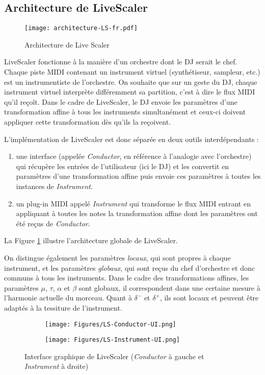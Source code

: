 \subsection{Architecture de LiveScaler}

\begin{figure}[htbp]
  \centering
	\texttt{[image: architecture-LS-fr.pdf]}
  \caption{Architecture de Live Scaler\label{fig:archi}}
\end{figure}

LiveScaler fonctionne à la manière d'un orchestre dont le  DJ serait le chef. Chaque piste MIDI contenant un instrument virtuel (synthétiseur, sampleur, etc.) est un instrumentiste de l'orchestre. On souhaite que sur un geste du DJ, chaque instrument virtuel interprète différemment sa partition, c'est à dire le flux MIDI qu'il reçoît. Dans le cadre de LiveScaler, le DJ envoie les paramètres d'une transformation affine à tous les instruments simultanément et ceux-ci doivent appliquer cette transformation dès qu'ils la reçoivent.

L'implémentation de LiveScaler est donc séparée en deux outils interdépendants : 
\begin{enumerate}
  \item une interface (appelée \emph{Conductor}, en référence à l'analogie avec l'orchestre) qui récupère les entrées de l'utilisateur (ici le DJ) et les convertit en paramètres d'une transformation affine puis envoie ces paramètres à toutes les instances de \emph{Instrument}.
  \item un plug-in MIDI appelé \emph{Instrument} qui transforme le flux MIDI entrant en appliquant à toutes les notes la transformation affine dont les paramètres ont été reçus de \emph{Conductor}.
\end{enumerate}
La Figure \ref{fig:archi} illustre l'architecture globale de LiveScaler.

On distingue également les paramètres \emph{locaux}, qui sont propres à chaque instrument, et les paramètres \emph{globaux}, qui sont reçus du chef d'orchestre et donc communs à tous les instruments. Dans le cadre des transformations affines, les paramètres $\mu$, $\tau$, $\alpha$  et $\beta$ sont globaux, il correspondent dans une certaine mesure à l'harmonie actuelle du morceau. Quant à $\delta^-$ et $\delta^+$, ils sont locaux et peuvent être adaptés à la tessiture de l'instrument.
\begin{figure*}[h]
  \centering
  \begin{subfigure}{0.83\textwidth}
    \texttt{[image: Figures/LS-Conductor-UI.png]}
  \end{subfigure}
  \begin{subfigure}{0.15\textwidth}
    \texttt{[image: Figures/LS-Instrument-UI.png]}
  \end{subfigure}
  
  \caption{Interface graphique de LiveScaler (\emph{Conductor} à gauche  et  \emph{Instrument} à droite) }
  \label{fig:LiveScalerUI}
\end{figure*}

